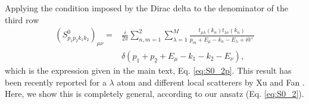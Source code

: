 \documentclass[notitlepage, prx, preprint, amsmath,superscriptaddress,amssymb]{revtex4-1}
\begin{document}
Applying the condition imposed by the Dirac delta to the denominator of the third row
\begin{align}
(S_{p_1p_2k_1k_2}^0)_{\mu\nu}=  &\frac{i}{2\pi}\sum_{n,m=1}^2 \sum_{\lambda=1}^M  \frac{t_{\mu\lambda}(k_n) t_{\lambda\nu}(k_{\overline{n}})}{p_m+E_\mu -k_n -E_\lambda + i0^+}\nonumber\\
&\delta(p_1+p_2+E_\mu - k_1-k_2-E_\nu),
\end{align}
which is the expression given in the main text, Eq. \eqref{eq:S0_2p}. This result has been recently reported for a $\lambda$ atom and different local scatterers by Xu and Fan \cite{Xu2016}. Here, we show this is completely general, according to our ansatz (Eq. \eqref{eq:S0_2}).


\end{document}
